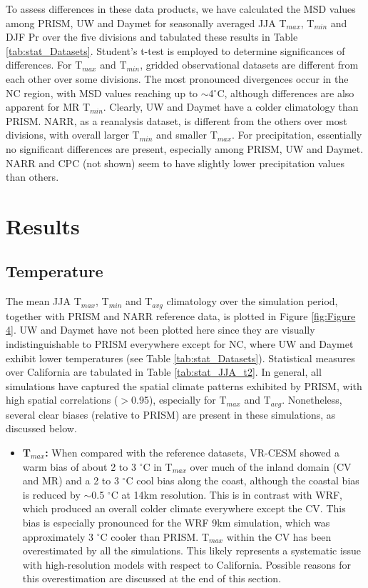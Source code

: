 \documentclass[draft,ms]{agutex}   %
\begin{document}
\begin{article}
To assess differences in these data products, we have calculated the MSD values among PRISM, UW and Daymet for seasonally averaged JJA T$_{max}$, T$_{min}$ and DJF Pr over the five divisions and tabulated these results in Table \ref{tab:stat_Datasets}. Student's t-test is employed to determine significances of differences. For T$_{max}$ and T$_{min}$, gridded observational datasets are different from each other over some divisions.  The most pronounced divergences occur in the NC region, with MSD values reaching up to $\sim$4$^\circ$C, although differences are also apparent for MR T$_{min}$. Clearly, UW and Daymet have a colder climatology than PRISM. NARR, as a reanalysis dataset, is different from the others over most divisions, with overall larger T$_{min}$ and smaller T$_{max}$. For precipitation, essentially no significant differences are present, especially among PRISM, UW and Daymet. NARR and CPC (not shown) seem to have slightly lower precipitation values than others.

\section{Results}

\subsection{Temperature}


The mean JJA T$_{max}$, T$_{min}$ and T$_{avg}$ climatology over the simulation period, together with PRISM and NARR reference data, is plotted in Figure \ref{fig:Figure 4}. UW and Daymet have not been plotted here since they are visually indistinguishable to PRISM everywhere except for NC, where UW and Daymet exhibit lower temperatures (see Table \ref{tab:stat_Datasets}).  Statistical measures over California are tabulated in Table \ref{tab:stat_JJA_t2}. In general, all simulations have captured the spatial climate patterns exhibited by PRISM, with high spatial correlations ($>$0.95), especially for T$_{max}$ and T$_{avg}$.  Nonetheless, several clear biases (relative to PRISM) are present in these simulations, as discussed below.


\begin{itemize}
\item{} \textbf{T$_{max}$:}  When compared with the reference datasets, VR-CESM showed a warm bias of about 2 to 3 $^\circ$C in T$_{max}$ over much of the inland domain (CV and MR) and a 2 to 3 $^\circ$C cool bias along the coast, although the coastal bias is reduced by $\sim$0.5 $^\circ$C at 14km resolution. This is in contrast with WRF, which produced an overall colder climate everywhere except the CV.  This bias is especially pronounced for the WRF 9km simulation, which was approximately 3 $^\circ$C cooler than PRISM. T$_{max}$ within the CV has been overestimated by all the simulations. This likely represents a systematic issue with high-resolution models with respect to California.  Possible reasons for this overestimation are discussed at the end of this section.



\end{itemize}
\end{article}
\end{document}
